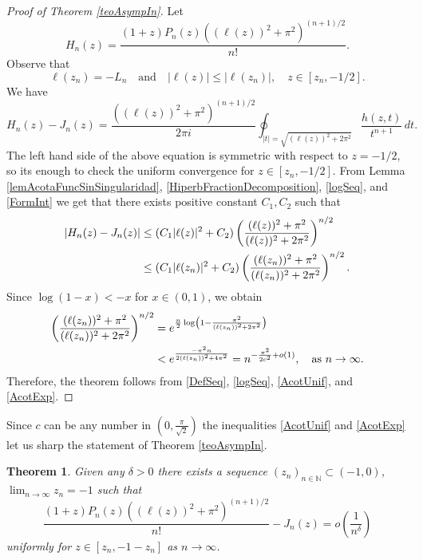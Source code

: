 \documentclass[11pt]{article}
\newtheorem{theo}{Theorem}
\newcommand{\N}{\mathbb{N}}
\begin{document}
\begin{proof}[Proof of Theorem \ref{teoAsympIn}] Let
\[
H_n(z)=\frac{(1+z)P_n(z)((\ell(z))^2+\pi^2)^{(n+1)/2}}{n!}.
\]
Observe that
\begin{equation}
\label{logSeq}
\ell(z_n)=-L_n\quad \text{and}\quad |\ell(z)|\le |\ell(z_n)|,\quad z\in  [z_n,-1/2].
\end{equation}
 We have
\begin{equation}\label{FormInt}
H_n(z)-J_n(z)=\frac{((\ell(z))^2+\pi^2)^{(n+1)/2}}{2\pi i}\oint_{|t|=\sqrt{(\ell(z))^2+2\pi^2}}\frac{h(z,t)}{t^{n+1}}\, dt.
\end{equation}
The left hand side of the above equation is symmetric with respect to $z=-1/2$, so its enough to check the uniform convergence for $z\in [z_n,-1/2]$.
From Lemma \ref{lemAcotaFuncSinSingularidad}, \eqref{HiperbFractionDecomposition}, \eqref{logSeq}, and \eqref{FormInt} we get that there exists positive constant $C_1,C_2$ such that
\begin{align}\notag
\left|H_n(z)-J_n(z)\right| &\le (C_1|\ell(z)|^2+C_2)\left(\frac{(\ell(z))^2+\pi^2}{(\ell(z))^2+2\pi^2}\right)^{n/2}\\ &\le (C_1|\ell(z_n)|^2+C_2)\left(\frac{(\ell(z_n))^2+\pi^2}{(\ell(z_n))^2+2\pi^2}\right)^{n/2}.\label{AcotUnif}
\end{align}
Since $\log(1-x)<-x$ for $x\in (0,1)$, we obtain
\begin{align}
\left(\frac{(\ell(z_n))^2+\pi^2}{(\ell(z_n))^2+2\pi^2}\right)^{n/2}&=e^{\frac{n}{2}\notag\log\left(1-\frac{\pi^2}{(\ell(z_n))^2+2\pi^2}\right)}\\ &<e^{\frac{-\pi^2 n}{2(\ell(z_n))^2+4\pi^2}}=n^{-\frac{\pi^2}{2c^2}+o(1)},\quad \text{as }n\to\infty.\label{AcotExp}
\end{align}
Therefore, the theorem follows from \eqref{DefSeq}, \eqref{logSeq}, \eqref{AcotUnif}, and \eqref{AcotExp}.
\end{proof}

Since $c$ can be any number in $(0,\frac{\pi}{\sqrt{2}})$ the inequalities \eqref{AcotUnif} and \eqref{AcotExp} let us sharp the statement of Theorem \ref{teoAsympIn}.

\begin{theo}  \label{teoAsympIn2}  Given any $\delta>0$ there exists a  sequence $(z_n)_{n\in\N}\subset (-1,0)$, $\lim_{n\to\infty}z_n=-1$ such that
\[
\frac{(1+z)P_n(z)((\ell(z))^2+\pi^2)^{(n+1)/2}}{n!}-J_n(z)=o(\frac1{n^{\delta}})
\]
uniformly for $z\in[z_n,-1-z_n]$ as $n\to\infty$.
\end{theo}
\end{document}
